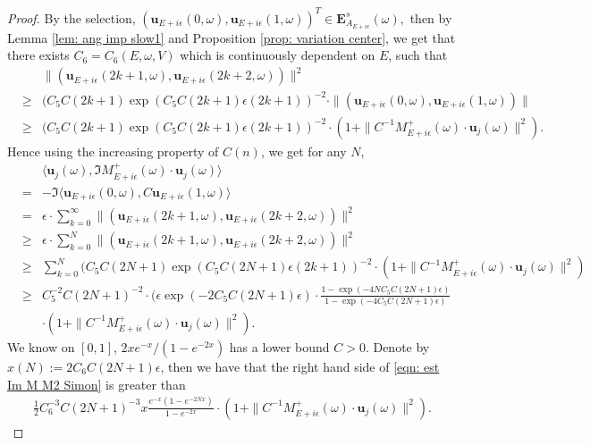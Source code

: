 \documentclass[10pt,a4paper]{amsart}
\newcommand{\E}{{\mathbf E}}
\begin{document}
\begin{proof}
By the selection, 
$\left(\mathbf{u}_{E+i\epsilon}(0,\omega), \mathbf{u}_{E+i\epsilon}(1,\omega)\right)^{T} \in \E^s_{A_{E+i\epsilon}}(\omega),$
then by 
Lemma \ref{lem: ang imp slow1} and  Proposition \ref{prop: variation center}, we get that there exists $C_6=C_6(E,\omega,V)$ which is continuously dependent on $E$, such that 
\begin{eqnarray*}
&&\|(\mathbf{u}_{E+i\epsilon}(2k+1,\omega), \mathbf{u}_{E+i\epsilon}(2k+2,\omega))\|^2\\
&\geq& (C_5C(2k+1)\exp(C_5C(2k+1)\epsilon (2k+1))^{-2}\cdot \|(\mathbf{u}_{E+i\epsilon}(0,\omega), \mathbf{u}_{E+i\epsilon}(1,\omega))\|  \\
&\geq &(C_5C(2k+1)\exp(C_5C(2k+1)\epsilon (2k+1))^{-2} \cdot (1+\|C^{-1}M_{E+i\epsilon}^+(\omega)\cdot \mathbf{u}_j(\omega)\|^2).
\end{eqnarray*}
Hence using the increasing property of $C(n)$, we get for any $N$, 
\begin{eqnarray}
&&\langle\mathbf{u}_j(\omega), \Im M_{E+i\epsilon}^+(\omega)\cdot \mathbf{u}_j(\omega)\rangle \nonumber \\
&=&-\Im  \langle\mathbf{u}_{E+i\epsilon}(0,\omega),  C\mathbf{u}_{E+i\epsilon}(1,\omega)\rangle \nonumber \\
&=&\epsilon\cdot \sum_{k=0}^\infty \|(\mathbf{u}_{E+i\epsilon}(2k+1,\omega), \mathbf{u}_{E+i\epsilon}(2k+2,\omega))\|^2  \nonumber \\
&\geq &\epsilon\cdot \sum_{k=0}^N \|(\mathbf{u}_{E+i\epsilon}(2k+1,\omega), \mathbf{u}_{E+i\epsilon}(2k+2,\omega))\|^2 \nonumber\\
&\geq & \sum_{k=0}^N (C_5C(2N+1)\exp(C_5C(2N+1)\epsilon (2k+1))^{-2} \cdot (1+\|C^{-1}M_{E+i\epsilon}^+(\omega)\cdot \mathbf{u}_j(\omega)\|^2)\nonumber\\
&\geq & C_5^{-2}C(2N+1)^{-2}\cdot(\epsilon\exp(-2C_5C(2N+1)\epsilon)\cdot \frac{1-\exp(-4N C_5 C(2N+1)\epsilon)}{1-\exp(-4C_5C(2N+1)\epsilon)}\nonumber\\ && \cdot(1+\|C^{-1}M_{E+i\epsilon}^+(\omega)\cdot \mathbf{u}_j(\omega)\|^2). \label{eqn: est Im M M2 Simon}
\end{eqnarray}
 We know on $[0,1]$, $2xe^{-x}/(1-e^{-2x})$ has a lower bound $C>0$. Denote by $x(N):=2C_6C(2N+1)\epsilon$, then we have that the right hand side of \eqref{eqn: est Im M M2 Simon} is greater than 
\begin{eqnarray*}
\frac{1}{2}  C_6^{-3}C(2N+1)^{-3} x\frac{e^{-x}(1-e^{-2Nx})}{1-e^{-2x}} \cdot (1+\|C^{-1}M_{E+i\epsilon}^+(\omega)\cdot \mathbf{u}_j(\omega)\|^2) .

\end{eqnarray*}
\end{proof}
\end{document}
